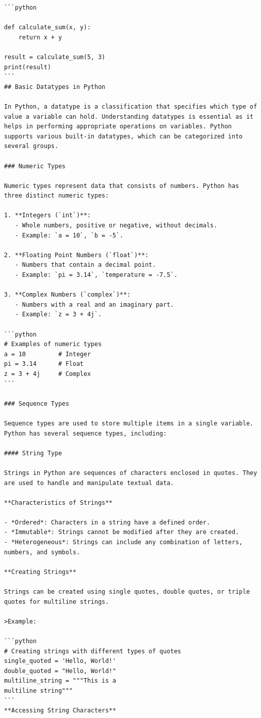 \documentclass[
  letterpaper,
  DIV=11,
  numbers=noendperiod]{scrreprt}
\theoremstyle{plain}
\theoremstyle{definition}
\theoremstyle{remark}
\begin{document}
\begin{verbatim}
```python

def calculate_sum(x, y):
    return x + y

result = calculate_sum(5, 3)
print(result)
```
## Basic Datatypes in Python

In Python, a datatype is a classification that specifies which type of value a variable can hold. Understanding datatypes is essential as it helps in performing appropriate operations on variables. Python supports various built-in datatypes, which can be categorized into several groups.

### Numeric Types

Numeric types represent data that consists of numbers. Python has three distinct numeric types:

1. **Integers (`int`)**:
   - Whole numbers, positive or negative, without decimals.
   - Example: `a = 10`, `b = -5`.

2. **Floating Point Numbers (`float`)**:
   - Numbers that contain a decimal point.
   - Example: `pi = 3.14`, `temperature = -7.5`.

3. **Complex Numbers (`complex`)**:
   - Numbers with a real and an imaginary part.
   - Example: `z = 3 + 4j`.

```python
# Examples of numeric types
a = 10         # Integer
pi = 3.14      # Float
z = 3 + 4j     # Complex
```

### Sequence Types

Sequence types are used to store multiple items in a single variable. Python has several sequence types, including:

#### String Type

Strings in Python are sequences of characters enclosed in quotes. They are used to handle and manipulate textual data.

**Characteristics of Strings**

- *Ordered*: Characters in a string have a defined order.
- *Immutable*: Strings cannot be modified after they are created.
- *Heterogeneous*: Strings can include any combination of letters, numbers, and symbols.

**Creating Strings**

Strings can be created using single quotes, double quotes, or triple quotes for multiline strings.

>Example:

```python
# Creating strings with different types of quotes
single_quoted = 'Hello, World!'
double_quoted = "Hello, World!"
multiline_string = """This is a
multiline string"""
```
**Accessing String Characters**


\end{verbatim}
\end{document}
